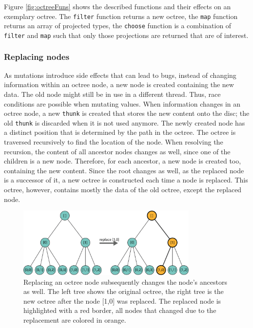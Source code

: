 Figure \ref{fig:octreeFuns} shows the described functions and their effects on an exemplary octree. The \verb|filter| function returns a new octree, the \verb|map| function returns an array of projected types, the \verb|choose| function is a combination of \verb|filter| and \verb|map| such that only those projections are returned that are of interest. 


\subsubsection{Replacing nodes}

As mutations introduce side effects that can lead to bugs, instead of changing information within an octree node, a new node is created containing the new data. The old node might still be in use in a different thread. Thus, race conditions are possible when mutating values. When information changes in an octree node, a new \verb|thunk| is created that stores the new content onto the disc; the old \verb|thunk| is discarded when it is not used anymore. The newly created node has a distinct position that is determined by the path in the octree. The octree is traversed recursively to find the location of the node. 
When resolving the recursion, the content of all ancestor nodes changes as well, since one of the children is a new node. Therefore, for each ancestor, a new node is created too, containing the new content. Since the root changes as well, as the replaced node is a successor of it, a new octree is constructed each time a node is replaced. This octree, however, contains mostly the data of the old octree, except the replaced node. 

\begin{figure}[h]
    \centering
    \includegraphics[width=0.8\textwidth]{Implementation/octreeReplace.png}
    \caption[Example on replacing an octree node]
		{Replacing an octree node subsequently changes the node's ancestors as well. The left tree shows the original octree, the right tree is the new octree after the node [1,0] was replaced. The replaced node is highlighted with a red border, all nodes that changed due to the replacement are colored in orange. }
    \label{fig:octreeReplace}
\end{figure}

